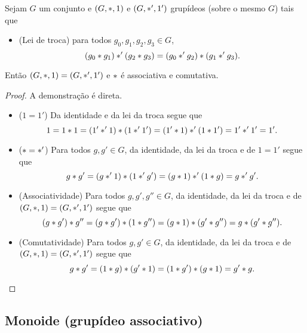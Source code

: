 \begin{proposition}
Sejam $G$ um conjunto e $(G,\ast,1)$ e $(G,\ast',1')$ grupídeos (sobre o mesmo $G$) tais que
	\begin{itemize}
		\item (Lei de troca) para todos $g_0,g_1,g_2,g_3 \in G$,
	\begin{equation*}
	(g_0 \ast g_1) \ast' (g_2 \ast g_3) = (g_0 \ast' g_2) \ast (g_1 \ast' g_3).
	\end{equation*}
	\end{itemize}
Então $(G,\ast,1) = (G,\ast',1')$ e $\ast$ é associativa e comutativa.
\end{proposition}
\begin{proof}
A demonstração é direta.
	\begin{itemize}
		\item ($1=1'$) Da identidade e da lei da troca segue que
		\begin{equation*}
		1 = 1 \ast 1 = (1' \ast' 1) \ast (1 \ast' 1') = (1' \ast 1) \ast' (1 \ast 1') = 1' \ast' 1' = 1'.
		\end{equation*}

		\item ($\ast = \ast'$) Para todos $g,g' \in G$, da identidade, da lei da troca e de $1=1'$ segue que
		\begin{equation*}
		g \ast g' = (g \ast' 1) \ast (1 \ast' g') = (g \ast 1) \ast' (1 \ast g) = g \ast' g'.
		\end{equation*}

		\item (Associatividade) Para todos $g,g',g'' \in G$, da identidade, da lei da troca e de $(G,\ast,1) = (G,\ast',1')$ segue que
		\begin{equation*}
		(g \ast g') \ast g'' = (g \ast g') \ast (1 \ast g'') = (g \ast 1) \ast (g' \ast g'') = g \ast (g' \ast g'').
		\end{equation*}

		\item (Comutatividade) Para todos $g,g' \in G$, da identidade, da lei da troca e de $(G,\ast,1) = (G,\ast',1')$ segue que
		\begin{equation*}
		g \ast g' = (1 \ast g) \ast (g' \ast 1) = (1 \ast g') \ast (g \ast 1) = g' \ast g.
		\qedhere
		\end{equation*}
	\end{itemize}
\end{proof}

\subsection{Monoide (grupídeo associativo)}

